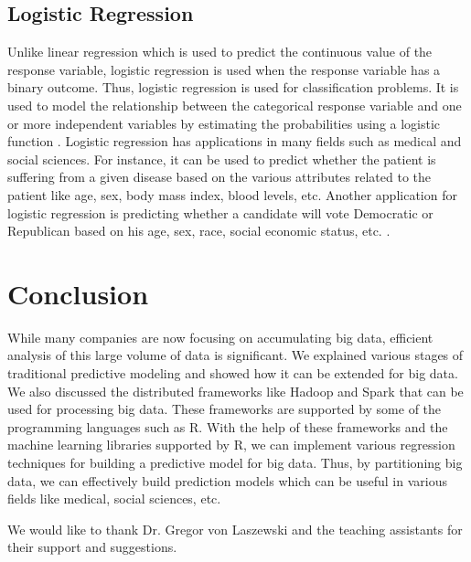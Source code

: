 \documentclass[sigconf]{acmart}
\begin{document}
\subsection{Logistic Regression}
Unlike linear regression which is used to predict the continuous value of the response variable, logistic regression is used when the response variable has a binary outcome. Thus, logistic regression is used for classification problems. It is used to model the relationship between the categorical response variable and one or more independent variables by estimating the probabilities using a logistic function \cite{log-reg}. Logistic regression has applications in many fields such as medical and social sciences. For instance, it can be used to predict whether the patient is suffering from a given disease based on the various attributes related to the patient like age, sex, body mass index, blood levels, etc. Another application for logistic regression is predicting whether a candidate will vote Democratic or Republican based on his age, sex, race, social economic status, etc. \cite{log-reg}.

\section{Conclusion}

While many companies are now focusing on accumulating big data, efficient analysis of this large volume of data is significant. We explained various stages of traditional predictive modeling and showed how it can be extended for big data. We also discussed the distributed frameworks like Hadoop and Spark that can be used for processing big data. These frameworks are supported by some of the programming languages such as R. With the help of these frameworks and the machine learning libraries supported by R, we can implement various regression techniques for building a predictive model for big data. Thus, by partitioning big data, we can effectively build prediction models which can be useful in various fields like medical, social sciences, etc.

\begin{acks}

  We would like to thank Dr. Gregor von Laszewski and the teaching assistants for their support and suggestions.

\end{acks}


 
\end{document}
